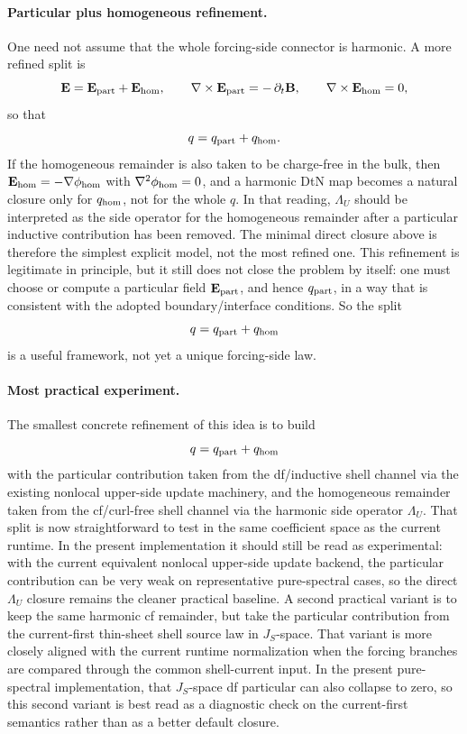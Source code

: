 \documentclass[11pt,a4paper]{article}
\begin{document}
\paragraph{Particular plus homogeneous refinement.}
One need not assume that the whole forcing-side connector is harmonic. A more
refined split is
\[
\mathbf E = \mathbf E_{\rm part} + \mathbf E_{\rm hom},
\qquad
\nabla\times \mathbf E_{\rm part} = -\,\partial_t\mathbf B,
\qquad
\nabla\times \mathbf E_{\rm hom} = 0,
\]
so that
\[
q = q_{\rm part} + q_{\rm hom}.
\]
If the homogeneous remainder is also taken to be charge-free in the bulk, then
\(\mathbf E_{\rm hom}=-\nabla\phi_{\rm hom}\) with
\(\nabla^2\phi_{\rm hom}=0\), and a harmonic DtN map becomes a natural closure
only for \(q_{\rm hom}\), not for the whole \(q\). In that reading,
\(\Lambda_U\) should be interpreted as the side operator for the homogeneous
remainder after a particular inductive contribution has been removed. The
minimal direct closure above is therefore the simplest explicit model, not the
most refined one. This refinement is legitimate in principle, but it still
does not close the problem by itself: one must choose or compute a particular
field \(\mathbf E_{\rm part}\), and hence \(q_{\rm part}\), in a way that is
consistent with the adopted boundary/interface conditions. So the split
\[
q=q_{\rm part}+q_{\rm hom}
\]
is a useful framework, not yet a unique forcing-side law.

\paragraph{Most practical experiment.}
The smallest concrete refinement of this idea is to build
\[
q = q_{\rm part} + q_{\rm hom}
\]
with the particular contribution taken from the df/inductive shell channel via
the existing nonlocal upper-side update machinery, and the homogeneous
remainder taken from the cf/curl-free shell channel via the harmonic side
operator \(\Lambda_U\). That split is now straightforward to test in the same
coefficient space as the current runtime. In the present implementation it
should still be read as experimental: with the current equivalent nonlocal
upper-side update backend, the particular contribution can be very weak on
representative pure-spectral cases, so the direct \(\Lambda_U\) closure
remains the cleaner practical baseline. A second practical variant is to keep
the same harmonic cf remainder, but take the particular contribution from the
current-first thin-sheet shell source law in \(J_S\)-space. That variant is
more closely aligned with the current runtime normalization when the forcing
branches are compared through the common shell-current input. In the present
pure-spectral implementation, that \(J_S\)-space df particular can also
collapse to zero, so this second variant is best read as a diagnostic check on
the current-first semantics rather than as a better default closure.
\end{document}
